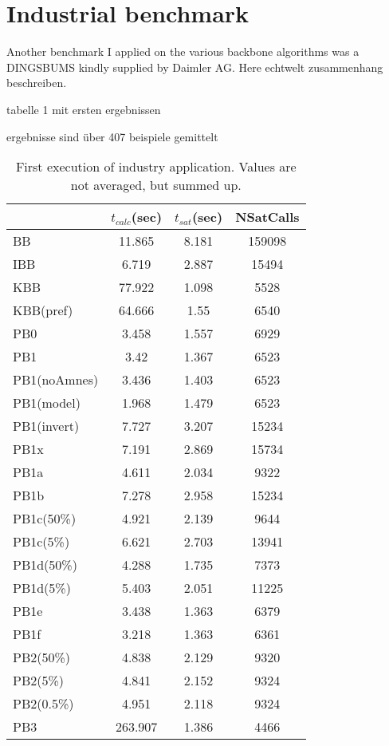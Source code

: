 \section{Industrial benchmark}

Another benchmark I applied on the various backbone algorithms was a DINGSBUMS kindly supplied by Daimler AG. Here echtwelt zusammenhang beschreiben.



tabelle 1 mit ersten ergebnissen

ergebnisse sind über 407 beispiele gemittelt
\begin{table}
\label{tab:vonThore1} %
\begin{tabular}{l| c c c }
&	$t_{calc}$(sec) &	$t_{sat}$(sec)	& NSatCalls \\
\hline
BB & 11.865 & 8.181 & 159098 \\
IBB & 6.719 & 2.887 & 15494 \\
KBB & 77.922 & 1.098 & 5528 \\
KBB(pref) & 64.666 & 1.55 & 6540 \\
PB0 & 3.458 & 1.557 & 6929 \\
PB1 & 3.42 & 1.367 & 6523 \\
PB1(noAmnes) & 3.436 & 1.403 & 6523 \\
PB1(model) & 1.968 & 1.479 & 6523 \\
PB1(invert) & 7.727 & 3.207 & 15234 \\
PB1x & 7.191 & 2.869 & 15734 \\
PB1a & 4.611 & 2.034 & 9322 \\
PB1b & 7.278 & 2.958 & 15234 \\
PB1c(50\%) & 4.921 & 2.139 & 9644 \\
PB1c(5\%) & 6.621 & 2.703 & 13941 \\
PB1d(50\%) & 4.288 & 1.735 & 7373 \\
PB1d(5\%) & 5.403 & 2.051 & 11225 \\
PB1e & 3.438 & 1.363 & 6379 \\
PB1f & 3.218 & 1.363 & 6361 \\
PB2(50\%) & 4.838 & 2.129 & 9320 \\
PB2(5\%) & 4.841 & 2.152 & 9324 \\
PB2(0.5\%) & 4.951 & 2.118 & 9324 \\
PB3 & 263.907 & 1.386 & 4466 \\
\end{tabular}
\caption{First execution of industry application. Values are not averaged, but summed up.}
\end{table}

